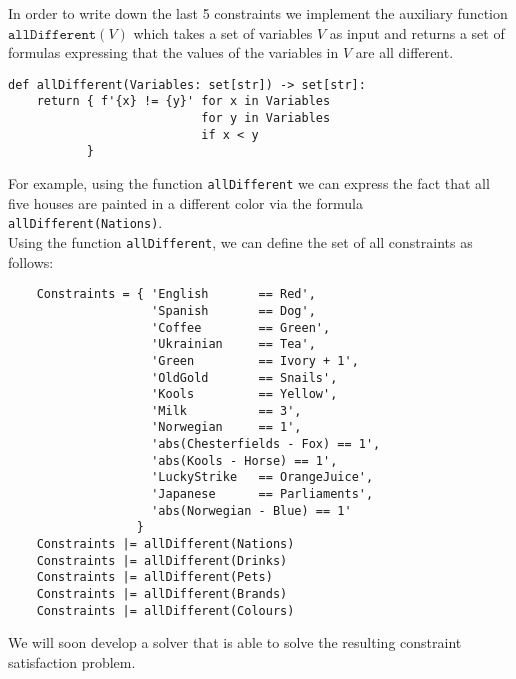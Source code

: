 In order to write down the last 5 constraints we implement the auxiliary function $\texttt{allDifferent}(V)$
which takes a set of variables $V$ as input and returns a set of formulas expressing that the values of the
variables in $V$ are all different.
\begin{verbatim}
def allDifferent(Variables: set[str]) -> set[str]:
    return { f'{x} != {y}' for x in Variables
                           for y in Variables 
                           if x < y 
           }
\end{verbatim}
For example, using the function \texttt{allDifferent} we can express the fact that all five houses are painted
in a different color via the formula
\\[0.2cm]
\hspace*{1.3cm}
\texttt{allDifferent(Nations)}.
\\[0.2cm]
Using the function \texttt{allDifferent}, we can define the set of all constraints as follows:
\begin{verbatim}
    Constraints = { 'English       == Red',          
                    'Spanish       == Dog',          
                    'Coffee        == Green',        
                    'Ukrainian     == Tea',          
                    'Green         == Ivory + 1',                         
                    'OldGold       == Snails',       
                    'Kools         == Yellow',       
                    'Milk          == 3',            
                    'Norwegian     == 1',            
                    'abs(Chesterfields - Fox) == 1',                         
                    'abs(Kools - Horse) == 1',       
                    'LuckyStrike   == OrangeJuice',  
                    'Japanese      == Parliaments',  
                    'abs(Norwegian - Blue) == 1'     
                  }
    Constraints |= allDifferent(Nations)
    Constraints |= allDifferent(Drinks)
    Constraints |= allDifferent(Pets)
    Constraints |= allDifferent(Brands)
    Constraints |= allDifferent(Colours)
\end{verbatim}
We will soon develop a solver that is able to solve the resulting constraint satisfaction problem.

